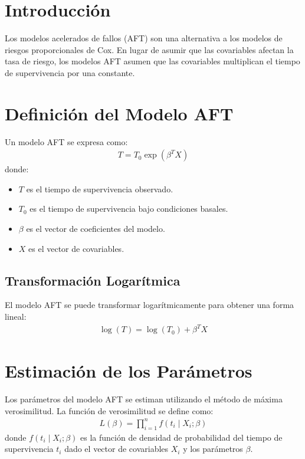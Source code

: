 \documentclass[a4paper]{report} %
\begin{document}
\section{Introducci\'on}
Los modelos acelerados de fallos (AFT) son una alternativa a los modelos de riesgos proporcionales de Cox. En lugar de asumir que las covariables afectan la tasa de riesgo, los modelos AFT asumen que las covariables multiplican el tiempo de supervivencia por una constante.

\section{Definici\'on del Modelo AFT}
Un modelo AFT se expresa como:
\begin{eqnarray*}
T = T_0 \exp(\beta^T X)
\end{eqnarray*}
donde:
\begin{itemize}
    \item $T$ es el tiempo de supervivencia observado.
    \item $T_0$ es el tiempo de supervivencia bajo condiciones basales.
    \item $\beta$ es el vector de coeficientes del modelo.
    \item $X$ es el vector de covariables.
\end{itemize}

\subsection{Transformaci\'on Logar\'itmica}
El modelo AFT se puede transformar logar\'itmicamente para obtener una forma lineal:
\begin{eqnarray*}
\log(T) = \log(T_0) + \beta^T X
\end{eqnarray*}

\section{Estimaci\'on de los Par\'ametros}
Los par\'ametros del modelo AFT se estiman utilizando el m\'etodo de m\'axima verosimilitud. La funci\'on de verosimilitud se define como:
\begin{eqnarray*}
L(\beta) = \prod_{i=1}^n f(t_i \mid X_i; \beta)
\end{eqnarray*}
donde $f(t_i \mid X_i; \beta)$ es la funci\'on de densidad de probabilidad del tiempo de supervivencia $t_i$ dado el vector de covariables $X_i$ y los par\'ametros $\beta$.
\end{document}
